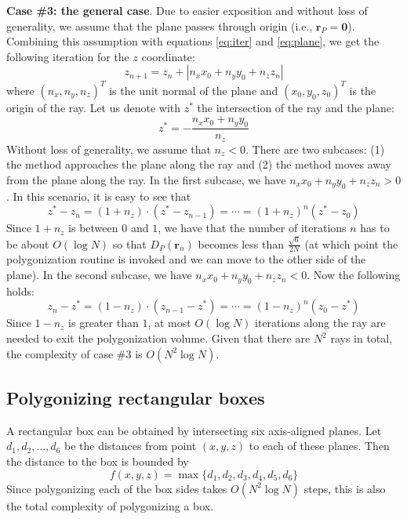 \documentclass[11pt,twocolumn]{article}
\begin{document}
			\textbf{Case \#3: the general case}.
			Due to easier exposition and without loss of generality, we assume that the plane passes through origin (i.e., $\mathbf{r}_P=\mathbf{0}$).
			Combining this assumption with equations \eqref{eq:iter} and \eqref{eq:plane}, we get the following iteration for the $z$ coordinate:
			\begin{equation}
				z_{n+1}=
				z_n + \left| n_x x_0 + n_y y_0 + n_z z_n \right|
			\end{equation}
			where $(n_x, n_y, n_z)^T$ is the unit normal of the plane and $(x_0, y_0, z_0)^T$ is the origin of the ray.
			Let us denote with $z^*$ the intersection of the ray and the plane:
			\begin{equation}
				z^*=
				-\frac{n_x x_0 + n_y y_0}{n_z}
			\end{equation}
			Without loss of generality, we assume that $n_z<0$.
			There are two subcases:
			(1) the method approaches the plane along the ray and (2) the method moves away from the plane along the ray.
			In the first subcase, we have $n_x x_0 + n_y y_0 + n_z z_n > 0$.
			In this scenario, it is easy to see that
			\begin{equation}
				z^* - z_n =
				(1 + n_z)\cdot (z^* - z_{n-1})=
				\cdots=
				(1 + n_z)^n (z^* - z_0)
			\end{equation}
			Since $1 + n_z$ is between $0$ and $1$, we have that the number of iterations $n$ has to be about $O(\log N)$ so that $D_P(\mathbf{r}_n)$ becomes less than $\frac{\sqrt{6}}{2N}$
			(at which point the polygonization routine is invoked and we can move to the other side of the plane).
			In the second subcase, we have $n_x x_0 + n_y y_0 + n_z z_n < 0$.
			Now the following holds:
			\begin{equation}
				z_n - z^* =
				(1 - n_z)\cdot (z_{n-1} - z^*)=
				\cdots=
				(1 - n_z)^n (z_0 - z^*)
			\end{equation}
			Since $1 - n_z$ is greater than $1$, at most $O(\log N)$ iterations along the ray are needed to exit the polygonization volume.
			Given that there are $N^2$ rays in total, the complexity of case \#3 is $O(N^2\log N)$.

		\subsection{Polygonizing rectangular boxes}
			A rectangular box can be obtained by intersecting six axis-aligned planes.
			Let $d_1, d_2, \ldots, d_6$ be the distances from point $(x, y, z)$ to each of these planes.
			Then the distance to the box is bounded by
			\begin{equation}\label{eq:boxdist}
				f(x, y, z)=
				\max\{d_1, d_2, d_3, d_4, d_5, d_6\}
			\end{equation}
			Since polygonizing each of the box sides takes $O(N^2\log N)$ steps, this is also the total complexity of polygonizing a box.
\end{document}
